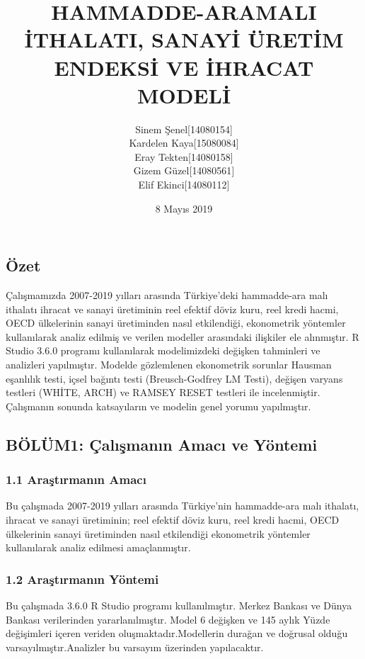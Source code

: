 \documentclass[]{article}
\title{HAMMADDE-ARAMALI İTHALATI, SANAYİ ÜRETİM ENDEKSİ VE İHRACAT MODELİ}
\author{Sinem Şenel{[}14080154{]} \\ Kardelen Kaya{[}15080084{]} \\ Eray Tekten{[}14080158{]} \\ Gizem Güzel{[}14080561{]} \\ Elif Ekinci{[}14080112{]}}
\date{8 Mayıs 2019}
\begin{document}
\maketitle

\subsection{Özet}\label{ozet}

Çalışmamızda 2007-2019 yılları arasında Türkiye'deki hammadde-ara malı
ithalatı ihracat ve sanayi üretiminin reel efektif döviz kuru, reel
kredi hacmi, OECD ülkelerinin sanayi üretiminden nasıl etkilendiği,
ekonometrik yöntemler kullanılarak analiz edilmiş ve verilen modeller
arasındaki ilişkiler ele alınmıştır. R Studio 3.6.0 programı
kullanılarak modelimizdeki değişken tahminleri ve analizleri
yapılmıştır. Modelde gözlemlenen ekonometrik sorunlar Hausman eşanlılık
testi, içsel bağıntı testi (Breusch-Godfrey LM Testi), değişen varyans
testleri (WHİTE, ARCH) ve RAMSEY RESET testleri ile incelenmiştir.
Çalışmanın sonunda katsayıların ve modelin genel yorumu yapılmıştır.

\subsection{BÖLÜM1: Çalışmanın Amacı ve
Yöntemi}\label{bolum1-calsmann-amac-ve-yontemi}

\subsubsection{1.1 Araştırmanın Amacı}\label{arastrmann-amac}

Bu çalışmada 2007-2019 yılları arasında Türkiye'nin hammadde-ara malı
ithalatı, ihracat ve sanayi üretiminin; reel efektif döviz kuru, reel
kredi hacmi, OECD ülkelerinin sanayi üretiminden nasıl etkilendiği
ekonometrik yöntemler kullanılarak analiz edilmesi amaçlanmıştır.

\subsubsection{1.2 Araştırmanın Yöntemi}\label{arastrmann-yontemi}

Bu çalışmada 3.6.0 R Studio programı kullanılmıştır. Merkez Bankası ve
Dünya Bankası verilerinden yararlanılmıştır. Model 6 değişken ve 145
aylık Yüzde değişimleri içeren veriden oluşmaktadır.Modellerin durağan
ve doğrusal olduğu varsayılmıştır.Analizler bu varsayım üzerinden
yapılacaktır.
\end{document}

